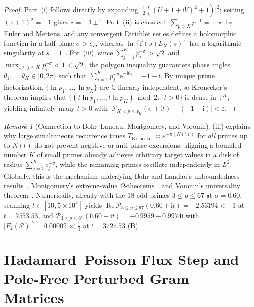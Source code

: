 \documentclass[11pt,reqno]{amsart}
\theoremstyle{plain}
\theoremstyle{definition}
\theoremstyle{remark}
\newtheorem{remark}[theorem]{Remark}
\numberwithin{equation}{section}
\newcommand{\ii}{\mathrm{i}}
\newcommand{\ee}{\mathrm{e}}
\DeclareMathOperator{\Reop}{Re}
\begin{document}
\begin{proof}
Part~(i) follows directly by expanding $\lvert\frac{1}{2}((U + 1 + \ii V)^2 + 1)\rvert^2$; setting $(z + 1)^2 = -1$ gives $z = -1 \pm \ii$. Part~(ii) is classical: $\sum_{p > X} p^{-1} = +\infty$ by Euler and Mertens, and any convergent Dirichlet series defines a holomorphic function in a half-plane $\sigma > \sigma_c$, whereas $\ln[\zeta(s)E_X(s)]$ has a logarithmic singularity at $s = 1$~\cite{titchmarsh1986}. For~(iii), since $\sum_{j=1}^K p_j^{-\sigma} > \sqrt{2}$ and $\max_{1 \le j \le K} p_j^{-\sigma} < 1 < \sqrt{2}$, the polygon inequality guarantees phase angles $\theta_1, \dots, \theta_K \in [0, 2\pi)$ such that $\sum_{j=1}^K p_j^{-\sigma}\ee^{-\ii\theta_j} = -1 - \ii$. By unique prime factorization, $\{\ln p_1, \dots, \ln p_K\}$ are $\mathbb{Q}$-linearly independent, so Kronecker's theorem implies that $\{(t\ln p_1, \dots, t\ln p_K) \bmod 2\pi : t > 0\}$ is dense in $\mathbb{T}^K$, yielding infinitely many $t > 0$ with $\lvert\mathcal{P}_{X < p \le p_K}(\sigma + \ii t) - (-1 - \ii)\rvert < \varepsilon$.
\end{proof}

\begin{remark}[Connection to Bohr--Landau, Montgomery, and Voronin]\label{rem:omega_theorems}
(iii) explains why large simultaneous recurrence times $T_{\mathrm{Kronecker}} \asymp \varepsilon^{-\pi(N(t))}$ for \emph{all} primes up to $N(t)$ do not prevent negative or anti-phase excursions: aligning a bounded number $K$ of small primes already achieves arbitrary target values in a disk of radius $\sum_{j=1}^K p_j^{-\sigma}$, while the remaining primes oscillate independently in $L^2$. Globally, this is the mechanism underlying Bohr and Landau's unboundedness results~\cite{bohrlandau1914}, Montgomery's extreme-value $\Omega$-theorems~\cite{montgomery1977}, and Voronin's universality theorem~\cite{voronin1975}. Numerically, already with the $18$ odd primes $3 \le p \le 67$ at $\sigma = 0.60$, scanning $t \in [10, 5 \times 10^4]$ yields $\Reop\mathcal{P}_{3 \le p \le 67}(0.60 + \ii t) = -2.53194 < -1$ at $t = 7563.53$, and $\mathcal{P}_{3 \le p \le 67}(0.60 + \ii t) = -0.9959 - 0.9974\ii$ with $\lvert F_2(\mathcal{P})\rvert^2 = 0.00002 \ll \frac{1}{4}$ at $t = 3724.53$ (B).
\end{remark}

\section{Hadamard--Poisson Flux Step and Pole-Free Perturbed Gram Matrices}\label{sec:flux}
\end{document}
